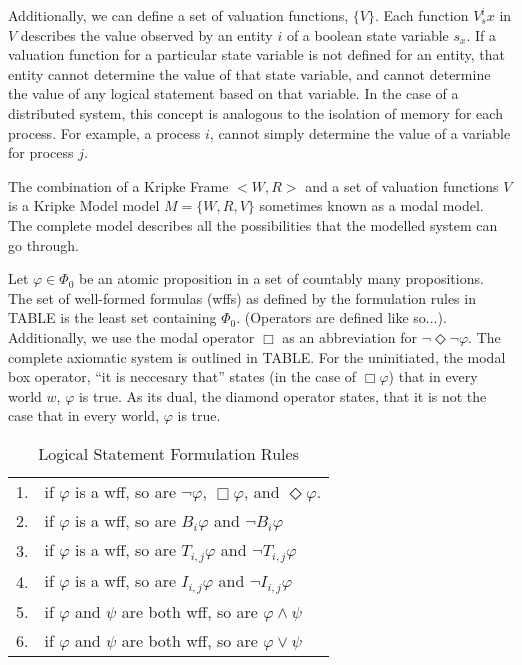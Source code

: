\documentclass[12pt,oneside]{article}
\begin{document}
Additionally, we can define a set of valuation functions, $\{V\}$. Each function $V^i_sx$ in $V$ describes the value observed by an entity $i$ of a boolean state variable $s_x$.  If a valuation function for a particular state variable is not defined for an entity, that entity cannot determine the value of that state variable, and cannot determine the value of any logical statement based on that variable. In the case of a distributed system, this concept is analogous to the isolation of memory for each process. For example, a process $i$, cannot simply determine the value of a variable for process $j$.

The combination of a Kripke Frame $< W,R >$ and a set of valuation functions ${V}$ is a Kripke Model model $M = \{W, R, V\}$ sometimes known as a modal model. The complete model describes all the possibilities that the modelled system can go through.

Let $\varphi \in \Phi_0$ be an atomic proposition in a set of countably many propositions. The set of well-formed formulas (wffs) as defined by the formulation rules in TABLE is the least set containing $\Phi_0$. (Operators are defined like so...). Additionally, we use the modal operator $\Box$ as an abbreviation for $\neg \Diamond \neg \varphi$. The complete axiomatic system is outlined in TABLE. For the uninitiated, the modal box operator, ``it is neccesary that'' states (in the case of $\Box \varphi$) that in every world $w$, $\varphi$ is true. As its dual, the diamond operator states, that it is not the case that in every world, $\varphi$ is true.

\begin{table*}[!t]
\centering
\begin{tabular}{r l}
1. & if $\varphi$ is a wff, so are $\neg \varphi$, $\Box \varphi$, and $\Diamond \varphi$. \\
2. & if $\varphi$ is a wff, so are $B_i \varphi$ and $\neg B_i \varphi$ \\
3. & if $\varphi$ is a wff, so are $T_{i,j} \varphi$ and $\neg T_{i,j} \varphi$ \\
4. & if $\varphi$ is a wff, so are $I_{i,j} \varphi$ and $\neg I_{i,j} \varphi$ \\
5. & if $\varphi$ and $\psi$ are both wff, so are $\varphi \wedge \psi$ \\
6. & if $\varphi$ and $\psi$ are both wff, so are $\varphi \vee \psi$ \\
\end{tabular}
\caption{Logical Statement Formulation Rules}
\label{tab:logform}
\end{table*}
\end{document}
